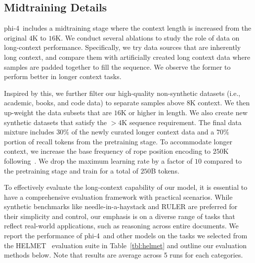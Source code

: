 \documentclass[11pt]{article}
\newcommand{\modelwithoutspace}{\textsf{phi-4}}
\newcommand{\model}{\modelwithoutspace~}
\begin{document}
\subsection{Midtraining Details}

\model includes a midtraining stage where the context length is increased from the original $4$K to $16$K. We conduct several ablations to study the role of data on long-context performance. Specifically, we try data sources that are inherently long context, and compare them with artificially created long context data where samples are padded together to fill the sequence. We observe the former to perform better in longer context tasks. 

Inspired by this, we further filter our high-quality non-synthetic datasets (i.e., academic, books, and code data) to separate samples above $8$K context. We then up-weight the data subsets that are $16$K or higher in length. We also create new synthetic datasets that satisfy the $>4$K sequence requirement. The final data mixture includes $30\%$ of the newly curated longer context data and a $70\%$ portion of recall tokens from the pretraining stage. To accommodate longer context, we increase the base frequency of rope position encoding to $250$K following~\cite{llama3report}. We drop the maximum learning rate by a factor of $10$ compared to the pretraining stage and train for a total of $250$B tokens.

To effectively evaluate the long-context capability of our model, it is essential to have a comprehensive evaluation framework with practical scenarios. While synthetic benchmarks like needle-in-a-haystack and RULER are preferred for their simplicity and control, our emphasis is on a diverse range of tasks that reflect real-world applications, such as reasoning across entire documents. 
We report the performance of \model and other models on the tasks we selected from the HELMET~\cite{yen2024helmetevaluatelongcontextlanguage} evaluation suite in Table~\ref{tbl:helmet} and outline our evaluation methods below. Note that results are average across 5 runs for each categories.
\end{document}

